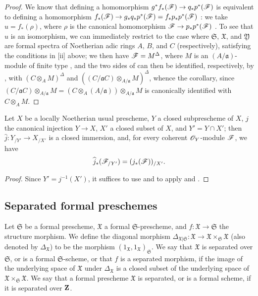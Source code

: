 \begin{proof}
We know that defining a homomorphism $g^*f_*(\sh{F}) \to q_*p^*(\sh{F})$ is equivalent to defining a homomorphism $f_*(\sh{F}) \to g_*q_*p^*(\sh{F}) = f_*p_*p^*(\sh{F})$ :
we take $u=f_*(\rho)$, where $\rho$ is the canonical homomorphism $\sh{F}\to p_*p^*(\sh{F})$ .
To see that $u$ is an isomorphism, we can immediately restrict to the case where $\mathfrak{S}$, $\mathfrak{X}$, and $\mathfrak{Y}$ are formal spectra of Noetherian adic rings $A$, $B$, and $C$ (respectively), satisfying the conditions in [ii] above;
we then have $\mathscr{F}=M^\Delta$, where $M$ is an $(A/\mathfrak{a})$-module of finite type , and the two sides of  can then be identified, respectively, by , with $(C\otimes_A M)^\Delta$ and $((C/\mathfrak{a}C)\otimes_{A/\mathfrak{a}}M)^\Delta$, whence the corollary, since $(C/\mathfrak{a}C)\otimes_{A/\mathfrak{a}}M = (C\otimes_A(A/\mathfrak{a}))\otimes_{A/\mathfrak{a}}M$ is canonically identified with $C\otimes_A M$.
\end{proof}

\begin{corollary}[10.14.7]
\label{I.10.14.7}
Let $X$ be a locally Noetherian usual prescheme, $Y$ a closed subprescheme of $X$, $j$ the canonical injection $Y\to X$, $X'$ a closed subset of $X$, and $Y'=Y\cap X'$;
then $\widehat{j}:Y_{/Y'}\to X_{/X'}$ is a closed immersion, and, for every coherent $\mathscr{O}_Y$-module $\mathscr{F}$, we have
\[
    \widehat{j}_*(\mathscr{F}_{/Y'}) = (j_*(\mathscr{F}))_{/X'}.
\]
\end{corollary}

\begin{proof}
Since $Y'=j^{-1}(X')$, it suffices to use  and to apply  and .
\end{proof}

\subsection{Separated formal preschemes}
\label{subsection:I.10.15}

\begin{definition}[10.15.1]
\label{I.10.15.1}
Let $\mathfrak{S}$ be a formal prescheme, $\mathfrak{X}$ a formal $\mathfrak{S}$-prescheme, and $f:\mathfrak{X}\to\mathfrak{S}$ the structure morphism.
We define the diagonal morphism $\Delta_{\mathfrak{X}|\mathfrak{S}}:\mathfrak{X}\to\mathfrak{X}\times_\mathfrak{S}\mathfrak{X}$ (also denoted by $\Delta_\mathfrak{X}$) to be the morphism $(1_\mathfrak{X},1_\mathfrak{X})_\mathfrak{S}$.
We say that $\mathfrak{X}$ is separated over $\mathfrak{S}$, or is a formal $\mathfrak{S}$-scheme, or that $f$ is a separated morphism, if the image of the underlying space of $\mathfrak{X}$ under $\Delta_\mathfrak{X}$ is a closed subset of the underlying space of $\mathfrak{X}\times_\mathfrak{S}\mathfrak{X}$.
We say that a formal prescheme $\mathfrak{X}$ is separated, or is a formal scheme, if it is separated over $\mathbf{Z}$.
\end{definition}


